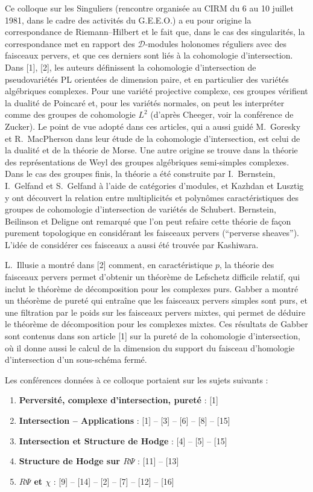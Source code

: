 \documentclass[12pt,a4paper]{article}
\theoremstyle{plain}
\theoremstyle{definition}
\theoremstyle{remark}
\newcommand{\cD}{\mathcal{D}}
\begin{document}
Ce colloque sur les Singuliers (rencontre organisée au CIRM du 6 au 10 juillet 1981, dans le cadre des activités du G.E.E.O.) a eu pour origine la correspondance de Riemann--Hilbert et le fait que, dans le cas des singularités, la correspondance met en rapport des $\cD$-modules holonomes réguliers avec des faisceaux pervers, et que ces derniers sont liés à la cohomologie d'intersection. Dans [1], [2], les auteurs définissent la cohomologie d'intersection de pseudovariétés PL orientées de dimension paire, et en particulier des variétés algébriques complexes. Pour une variété projective complexe, ces groupes vérifient la dualité de Poincaré et, pour les variétés normales, on peut les interpréter comme des groupes de cohomologie $L^{2}$ (d'après Cheeger, voir la conférence de Zucker). Le point de vue adopté dans ces articles, qui a aussi guidé M.~Goresky et R.~MacPherson dans leur étude de la cohomologie d'intersection, est celui de la dualité et de la théorie de Morse. Une autre origine se trouve dans la théorie des représentations de Weyl des groupes algébriques semi-simples complexes. Dans le cas des groupes finis, la théorie a été construite par I.~Bernstein, I.~Gelfand et S.~Gelfand à l'aide de catégories d'modules, et Kazhdan et Lusztig y ont découvert la relation entre multiplicités et polynômes caractéristiques des groupes de cohomologie d'intersection de variétés de Schubert. Bernstein, Beilinson et Deligne ont remarqué que l'on peut refaire cette théorie de façon purement topologique en considérant les faisceaux pervers (``perverse sheaves''). L'idée de considérer ces faisceaux a aussi été trouvée par Kashiwara.

L.~Illusie a montré dans [2] comment, en caractéristique $p$, la théorie des faisceaux pervers permet d'obtenir un théorème de Lefschetz difficile relatif, qui inclut le théorème de décomposition pour les complexes purs. Gabber a montré un théorème de pureté qui entraîne que les faisceaux pervers simples sont purs, et une filtration par le poids sur les faisceaux pervers mixtes, qui permet de déduire le théorème de décomposition pour les complexes mixtes. Ces résultats de Gabber sont contenus dans son article [1] sur la pureté de la cohomologie d'intersection, où il donne aussi le calcul de la dimension du support du faisceau d'homologie d'intersection d'un sous-schéma fermé.

Les conférences données à ce colloque portaient sur les sujets suivants :
\begin{enumerate}[label=\alph*)]
\item \textbf{Perversité, complexe d'intersection, pureté} : [1]
\item \textbf{Intersection -- Applications} : [1] -- [3] -- [6] -- [8] -- [15]
\item \textbf{Intersection et Structure de Hodge} : [4] -- [5] -- [15]
\item \textbf{Structure de Hodge sur $R\Psi$} : [11] -- [13]
\item \textbf{$R\Psi$ et $\chi$} : [9] -- [14] -- [2] -- [7] -- [12] -- [16]
\end{enumerate}
\end{document}
